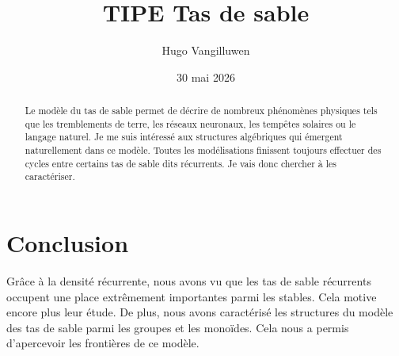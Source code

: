 \documentclass[11pt]{article}
\title{TIPE Tas de sable}
\author{Hugo Vangilluwen}
\date{30 mai 2026}
\theoremstyle{definition}
\theoremstyle{plain}
\theoremstyle{remark}
\begin{document}
\maketitle

\begin{abstract}
    Le modèle du tas de sable permet de décrire de nombreux phénomènes physiques
    tels que les tremblements de terre, les réseaux neuronaux, les tempêtes
    solaires ou le langage naturel. Je me suis intéressé aux structures
    algébriques qui émergent naturellement dans ce modèle. Toutes les
    modélisations finissent toujours effectuer des cycles entre certains tas de
    sable dits récurrents. Je vais donc chercher à les caractériser.
\end{abstract}

\tableofcontents











\section{Conclusion}

Grâce à la densité récurrente, nous avons vu que les tas de sable récurrents
occupent une place extrêmement importantes parmi les stables. Cela motive encore
plus leur étude.
De plus, nous avons caractérisé les structures du modèle des tas de sable parmi
les groupes et les monoïdes. Cela nous a permis d'apercevoir les frontières de
ce modèle.
\end{document}
